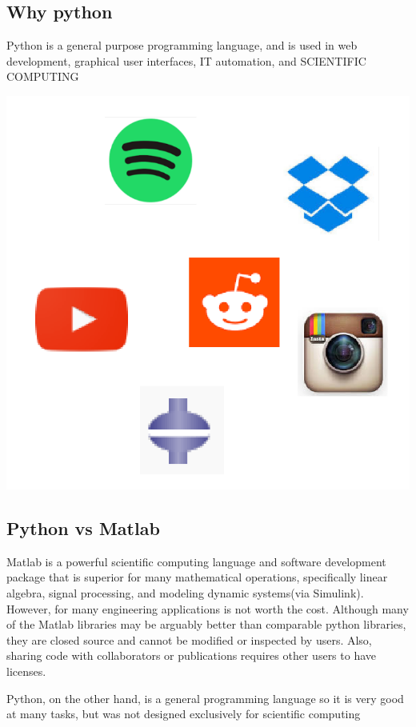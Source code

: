 \documentclass[%
oneside,                 %
final,                   %
10pt]{article}
\begin{document}
\subsection{Why python}

Python is a general purpose programming language, and is used in web development, graphical user interfaces, IT automation, and SCIENTIFIC COMPUTING



\centerline{\includegraphics[width=0.75\linewidth]{fig/pythonapps.png}}



\subsection{Python vs Matlab}

Matlab is a powerful scientific computing language and software development package that is superior for many mathematical operations, specifically linear algebra, signal processing, and modeling dynamic systems(via Simulink). However, for many engineering applications is not worth the cost. Although many of the Matlab libraries  may be arguably better than comparable python libraries, they are closed source and cannot be modified or inspected by users. Also, sharing code with collaborators or publications requires other users to have licenses.

Python, on the other hand, is a general programming language so it is very good at many tasks, but was not designed exclusively for scientific computing
\end{document}
